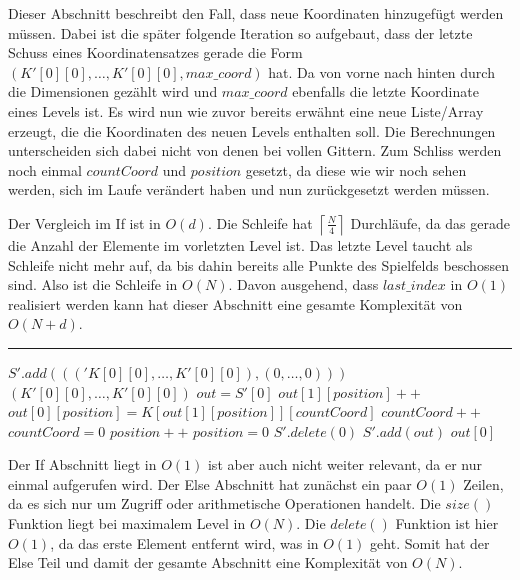 \documentclass[a4paper,12pt]{llncs}
\numberwithin{equation}{section}
\begin{document}
Dieser Abschnitt beschreibt den Fall, dass neue Koordinaten hinzugefügt werden müssen. Dabei ist die später folgende Iteration so aufgebaut, dass der letzte Schuss eines Koordinatensatzes gerade die Form $(K'[0][0],\dots,K'[0][0],max\_coord)$ hat. Da von vorne nach hinten durch die Dimensionen gezählt wird und $max\_coord$ ebenfalls die letzte Koordinate eines Levels ist. Es wird nun wie zuvor bereits erwähnt eine neue Liste/Array erzeugt, die die Koordinaten des neuen Levels enthalten soll. Die Berechnungen unterscheiden sich dabei nicht von denen bei vollen Gittern. Zum Schliss werden noch einmal $countCoord$ und $position$ gesetzt, da diese wie wir noch sehen werden, sich im Laufe verändert haben und nun zurückgesetzt werden müssen.

Der Vergleich im If ist in $O(d)$. Die Schleife hat $\left\lceil\frac{N}{4}\right\rceil$ Durchläufe, da das gerade die Anzahl der Elemente im vorletzten Level ist. Das letzte Level taucht als Schleife nicht mehr auf, da bis dahin bereits alle Punkte des Spielfelds beschossen sind. Also ist die Schleife in $O(N)$. Davon ausgehend, dass $last\_index$ in $O(1)$ realisiert werden kann hat dieser Abschnitt eine gesamte Komplexität von $O(N+d)$.

\smallskip
\hrule
\smallskip

\begin{tcolorbox}
	\begin{algorithmic}
		\State $S'.add((('K[0][0],\dots,K'[0][0]),(0,\dots,0)))$
		\State \Return $(K'[0][0],\dots,K'[0][0])$
		\Else
		\State $out = S'[0]$
		\State $out[1][position]++$
		\EndIf
		\State $out[0][position]=K[out[1][position]][countCoord]$
		\State $countCoord++$
		\State $countCoord=0$
		\State $position++$
		\State $position=0$
		\State $S'.delete(0)$
		\EndIf
		\EndIf
		\State $S'.add(out)$
		\State\Return $out[0]$
		\EndIf
	\end{algorithmic}
\end{tcolorbox}

Der If Abschnitt liegt in $O(1)$ ist aber auch nicht weiter relevant, da er nur einmal aufgerufen wird. Der Else Abschnitt hat zunächst ein paar $O(1)$ Zeilen, da es sich nur um Zugriff oder arithmetische Operationen handelt. Die $size()$ Funktion liegt bei maximalem Level in $O(N)$. Die $delete()$ Funktion ist hier $O(1)$, da das erste Element entfernt wird, was in $O(1)$ geht. Somit hat der Else Teil und damit der gesamte Abschnitt eine Komplexität von $O(N)$.
\end{document}
